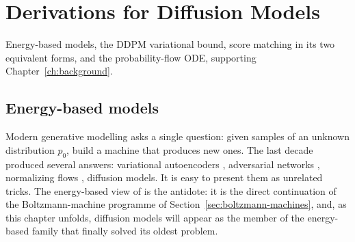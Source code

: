 \chapter{Derivations for Diffusion Models}
\label{app:diffusion-deriv}

Energy-based models, the DDPM variational bound, score matching in its two
equivalent forms, and the probability-flow ODE, supporting
Chapter~\ref{ch:background}.

\section{Energy-based models}\label{sec:ebm-def}

Modern generative modelling asks a single question: given samples of an
unknown distribution $p_0$, build a machine that produces new ones. The
last decade produced several answers: variational autoencoders
\citep{kingma2014auto}, adversarial networks
\citep{goodfellow2014generative}, normalizing flows
\citep{rezende2015variational}, diffusion models. It is easy to present
them as unrelated tricks. The energy-based view of
\citet{lecun2006tutorial} is the antidote: it is the direct continuation
of the Boltzmann-machine programme of
Section~\ref{sec:boltzmann-machines}, and, as this chapter unfolds,
diffusion models will appear as the member of the energy-based family
that finally solved its oldest problem.

